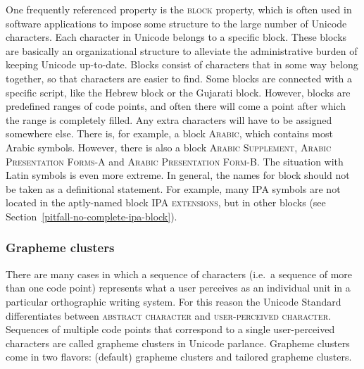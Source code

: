 One frequently referenced property is the \textsc{block} property, which is
often used in software applications to impose some structure to the large number
of Unicode characters. Each character in Unicode belongs to a specific block.
These blocks are basically an organizational structure to alleviate the
administrative burden of keeping Unicode up-to-date. Blocks consist of
characters that in some way belong together, so that characters are easier to
find. Some blocks are connected with a specific script, like the Hebrew block or
the Gujarati block. However, blocks are predefined ranges of code points, and
often there will come a point after which the range is completely filled. Any
extra characters will have to be assigned somewhere else. There is, for example,
a block \textsc{Arabic}, which contains most Arabic symbols. However, there is
also a block \textsc{Arabic Supplement}, \textsc{Arabic Presentation Forms-A}
and \textsc{Arabic Presentation Form-B}. The situation with Latin symbols is
even more extreme. In general, the names for block should not be taken as a
definitional statement. For example, many IPA symbols are not located in the
aptly-named block \textsc{IPA extensions}, but in other blocks
(see Section~\ref{pitfall-no-complete-ipa-block}).

\subsubsection*{Grapheme clusters}

There are many cases in which a sequence of characters (i.e.~a sequence of more
than one code point) represents what a user perceives as an individual unit in a
particular orthographic writing system. For this reason the Unicode Standard
differentiates between \textsc{abstract character} and \textsc{user-perceived
character}. Sequences of multiple code points that correspond to a single
user-perceived characters are called grapheme clusters in Unicode parlance.
Grapheme clusters come in two flavors: (default) grapheme clusters and tailored
grapheme clusters.

